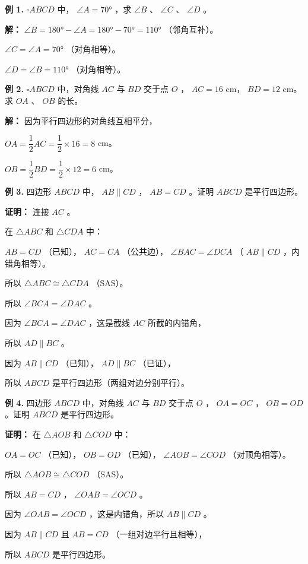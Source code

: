 \begin{workedexamples}


\textbf{例 1.} $\square ABCD$ 中， $\angle A = 70°$ ，求 $\angle B$ 、 $\angle C$ 、 $\angle D$ 。

\textbf{解：}
$\angle B = 180° - \angle A = 180° - 70° = 110°$ （邻角互补）。

$\angle C = \angle A = 70°$ （对角相等）。

$\angle D = \angle B = 110°$ （对角相等）。

\textbf{例 2.} $\square ABCD$ 中，对角线 $AC$ 与 $BD$ 交于点 $O$ ， $AC = 16$ cm， $BD = 12$ cm。求 $OA$ 、 $OB$ 的长。

\textbf{解：}
因为平行四边形的对角线互相平分，

$OA = \dfrac{1}{2}AC = \dfrac{1}{2} \times 16 = 8$ cm。

$OB = \dfrac{1}{2}BD = \dfrac{1}{2} \times 12 = 6$ cm。

\textbf{例 3.} 四边形 $ABCD$ 中， $AB \parallel CD$ ， $AB = CD$ 。证明 $ABCD$ 是平行四边形。

\textbf{证明：}
连接 $AC$ 。

在 $\triangle ABC$ 和 $\triangle CDA$ 中：

$AB = CD$ （已知）， $AC = CA$ （公共边）， $\angle BAC = \angle DCA$ （ $AB \parallel CD$ ，内错角相等）。

所以 $\triangle ABC \cong \triangle CDA$ （SAS）。

所以 $\angle BCA = \angle DAC$ 。

因为 $\angle BCA = \angle DAC$ ，这是截线 $AC$ 所截的内错角，

所以 $AD \parallel BC$ 。

因为 $AB \parallel CD$ （已知）， $AD \parallel BC$ （已证），

所以 $ABCD$ 是平行四边形（两组对边分别平行）。

\textbf{例 4.} 四边形 $ABCD$ 中，对角线 $AC$ 与 $BD$ 交于点 $O$ ， $OA = OC$ ， $OB = OD$ 。证明 $ABCD$ 是平行四边形。

\textbf{证明：}
在 $\triangle AOB$ 和 $\triangle COD$ 中：

$OA = OC$ （已知）， $OB = OD$ （已知）， $\angle AOB = \angle COD$ （对顶角相等）。

所以 $\triangle AOB \cong \triangle COD$ （SAS）。

所以 $AB = CD$ ， $\angle OAB = \angle OCD$ 。

因为 $\angle OAB = \angle OCD$ ，这是内错角，所以 $AB \parallel CD$ 。

因为 $AB \parallel CD$ 且 $AB = CD$ （一组对边平行且相等），

所以 $ABCD$ 是平行四边形。

\end{workedexamples}

